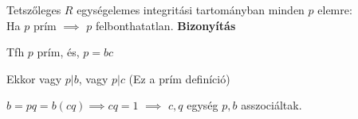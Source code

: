 \begin{frame}
\begin{tcolorbox}[title={Tétel: Prím és irreducibilis elem EIT-ban}]
Tetszőleges $R$ egységelemes integritási tartományban minden $p$ elemre:\\
Ha $p$ prím $\implies$ $p$ felbonthatatlan.
\tcblower
\textbf{Bizonyítás}\\
\mmedskip

Tfh $p$ prím, és, $p = bc$\\
\msmallskip

Ekkor vagy $p|b$, vagy $p|c$ (Ez a prím definíció)\\
\msmallskip

$b = pq = b(cq) \implies cq = 1$ $\implies$ $c, q$ egység $p, b$ asszociáltak.
\end{tcolorbox}
\end{frame}

